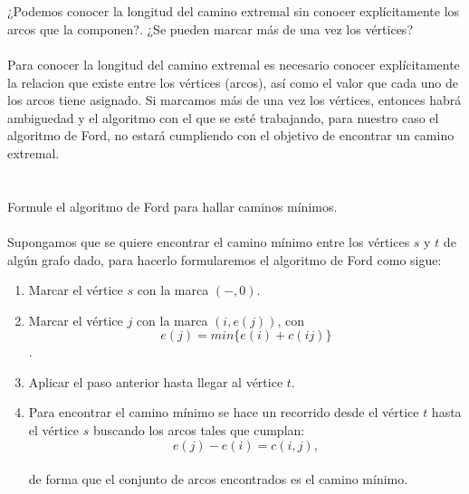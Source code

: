 \documentclass[autocontact]{gaceta}
\begin{document}
\section{}
    ¿Podemos conocer la longitud del camino extremal sin conocer explícitamente los arcos que la 
    componen?. ¿Se pueden marcar más de una vez los vértices? \\
    \\Para conocer la longitud del camino extremal es necesario conocer explícitamente
        la relacion que existe entre los vértices (arcos), así como el valor que cada uno de los arcos tiene
        asignado. Si marcamos más de una vez los vértices, entonces habrá ambiguedad y el algoritmo con el que
        se esté trabajando, para nuestro caso el algoritmo de Ford, no estará cumpliendo con el objetivo de 
        encontrar un camino extremal.





\section{}
    Formule el algoritmo de Ford para hallar caminos mínimos.\\
    \\Supongamos que se quiere encontrar el camino mínimo entre los vértices $s$ y $t$ de algún grafo dado,
        para hacerlo formularemos el algoritmo de Ford como sigue:
        \begin{center}
            \begin{enumerate}
                \item Marcar el vértice $s$ con la marca $(-, 0)$.
                \item Marcar el vértice $j$ con la marca $(i, e(j))$, con $$ e(j) = min \{e(i) + c(ij)\}$$.
                \item Aplicar el paso anterior hasta llegar al vértice $t$.
                \item Para encontrar el camino mínimo se hace un recorrido desde el vértice $t$ hasta el 
                        vértice $s$ buscando los arcos tales que cumplan: $$e(j) - e(i) = c(i,j),$$ \\de 
                        forma que el conjunto de arcos encontrados es el camino mínimo.
            \end{enumerate}
        \end{center}
\end{document}
